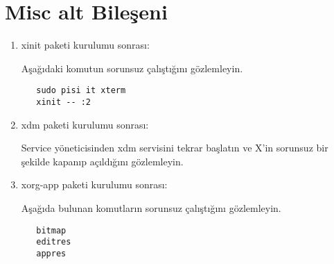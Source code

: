 \documentclass[a4paper,10pt]{article}
\begin{document}
\section{Misc alt Bileşeni}
\begin{enumerate}
\item xinit paketi kurulumu sonrası:

Aşağıdaki komutun sorunsuz çalıştığını gözlemleyin.
  \begin{verbatim}
   sudo pisi it xterm
   xinit -- :2
  \end{verbatim}

 \item xdm paketi kurulumu sonrası:

Service yöneticisinden xdm servisini tekrar başlatın ve X'in sorunsuz bir şekilde kapanıp açıldığını gözlemleyin.
 \item xorg-app paketi kurulumu sonrası:

Aşağıda bulunan komutların sorunsuz çalıştığını gözlemleyin.
  \begin{verbatim}
   bitmap
   editres
   appres
   
  \end{verbatim}


\end{enumerate}
\end{document}
